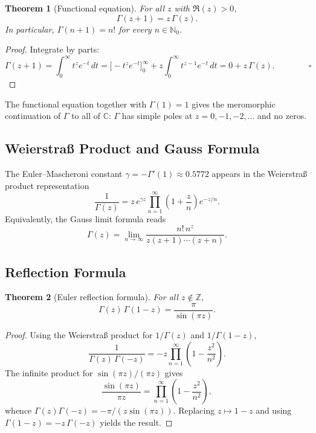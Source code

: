 \documentclass[12pt,a4paper]{amsart}
\newtheorem{theorem}{Theorem}[section]
\theoremstyle{definition}
\begin{document}
\begin{theorem}[Functional equation]\label{thm:gamma_functional}
For all \(z\) with \(\Re(z) > 0\),
\[
  \Gamma(z+1) = z\,\Gamma(z).
\]
In particular, \(\Gamma(n+1) = n!\) for every \(n \in \mathbb{N}_0\).
\end{theorem}

\begin{proof}
Integrate by parts:
\[
  \Gamma(z+1)
  = \int_0^\infty t^z e^{-t}\,dt
  = \bigl[-t^z e^{-t}\bigr]_0^\infty + z\int_0^\infty t^{z-1}e^{-t}\,dt
  = 0 + z\,\Gamma(z). \qquad\qquad\square
\]
\end{proof}

The functional equation together with \(\Gamma(1) = 1\) gives the meromorphic continuation
of \(\Gamma\) to all of \(\mathbb{C}\): \(\Gamma\) has simple poles at
\(z = 0, -1, -2, \ldots\) and no zeros.

\subsection{Weierstra\ss{} Product and Gauss Formula}

The Euler--Mascheroni constant \(\gamma = -\Gamma'(1) \approx 0.5772\) appears in the
Weierstra\ss{} product representation
\[
  \frac{1}{\Gamma(z)}
  = z\,e^{\gamma z}\prod_{n=1}^\infty \left(1+\frac{z}{n}\right)e^{-z/n}.
\]
Equivalently, the Gauss limit formula reads
\[
  \Gamma(z) = \lim_{n\to\infty} \frac{n!\,n^z}{z(z+1)\cdots(z+n)}.
\]

\subsection{Reflection Formula}

\begin{theorem}[Euler reflection formula]\label{thm:gamma_reflection}
For all \(z \notin \mathbb{Z}\),
\[
  \Gamma(z)\,\Gamma(1-z) = \frac{\pi}{\sin(\pi z)}.
\]
\end{theorem}

\begin{proof}
Using the Weierstra\ss{} product for \(1/\Gamma(z)\) and \(1/\Gamma(1-z)\),
\[
  \frac{1}{\Gamma(z)\,\Gamma(-z)}
  = -z\prod_{n=1}^\infty\left(1-\frac{z^2}{n^2}\right).
\]
The infinite product for \(\sin(\pi z)/(\pi z)\) gives
\[
  \frac{\sin(\pi z)}{\pi z} = \prod_{n=1}^\infty\left(1-\frac{z^2}{n^2}\right),
\]
whence \(\Gamma(z)\Gamma(-z) = -\pi/(z\sin(\pi z))\).
Replacing \(z\mapsto 1-z\) and using \(\Gamma(1-z) = -z\,\Gamma(-z)\) yields the result.
\end{proof}
\end{document}
